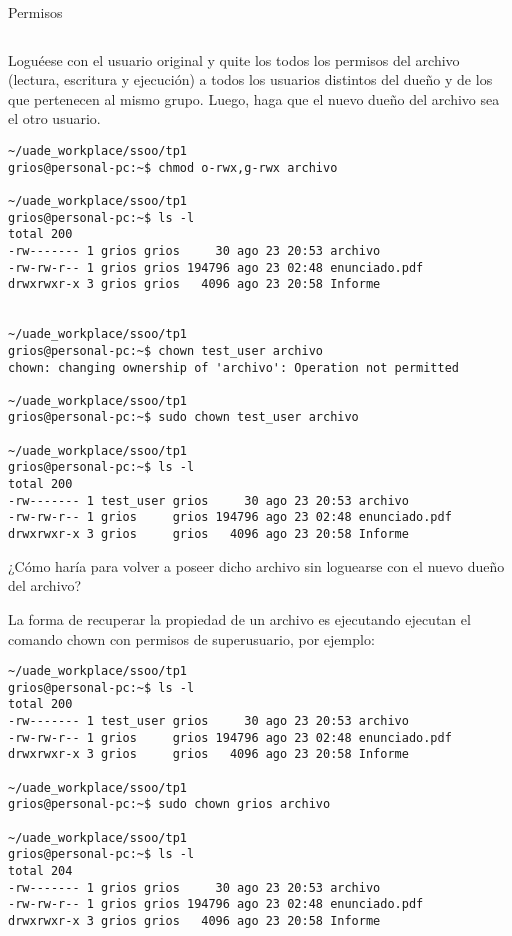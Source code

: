 \begin{section}{Permisos}
\begin{lstlisting}[style=Ubuntu]
\end{lstlisting}

\begin{quoting}
Loguéese con el usuario original y quite los todos los permisos del archivo (lectura, escritura y
ejecución) a todos los usuarios distintos del dueño y de los que pertenecen al mismo grupo. Luego, haga que
el nuevo dueño del archivo sea el otro usuario.
\end{quoting}

\begin{lstlisting}[style=Ubuntu]
~/uade_workplace/ssoo/tp1
grios@personal-pc:~$ chmod o-rwx,g-rwx archivo

~/uade_workplace/ssoo/tp1
grios@personal-pc:~$ ls -l                     
total 200
-rw------- 1 grios grios     30 ago 23 20:53 archivo
-rw-rw-r-- 1 grios grios 194796 ago 23 02:48 enunciado.pdf
drwxrwxr-x 3 grios grios   4096 ago 23 20:58 Informe


~/uade_workplace/ssoo/tp1
grios@personal-pc:~$ chown test_user archivo
chown: changing ownership of 'archivo': Operation not permitted

~/uade_workplace/ssoo/tp1
grios@personal-pc:~$ sudo chown test_user archivo

~/uade_workplace/ssoo/tp1
grios@personal-pc:~$ ls -l
total 200
-rw------- 1 test_user grios     30 ago 23 20:53 archivo
-rw-rw-r-- 1 grios     grios 194796 ago 23 02:48 enunciado.pdf
drwxrwxr-x 3 grios     grios   4096 ago 23 20:58 Informe

\end{lstlisting}

\begin{quoting}
¿Cómo haría para volver a poseer dicho archivo sin loguearse con el nuevo dueño del archivo?
\end{quoting}

La forma de recuperar la propiedad de un archivo es ejecutando ejecutan el comando chown con permisos de superusuario, por ejemplo:

\begin{lstlisting}[style=Ubuntu]
~/uade_workplace/ssoo/tp1
grios@personal-pc:~$ ls -l
total 200
-rw------- 1 test_user grios     30 ago 23 20:53 archivo
-rw-rw-r-- 1 grios     grios 194796 ago 23 02:48 enunciado.pdf
drwxrwxr-x 3 grios     grios   4096 ago 23 20:58 Informe

~/uade_workplace/ssoo/tp1
grios@personal-pc:~$ sudo chown grios archivo

~/uade_workplace/ssoo/tp1
grios@personal-pc:~$ ls -l
total 204
-rw------- 1 grios grios     30 ago 23 20:53 archivo
-rw-rw-r-- 1 grios grios 194796 ago 23 02:48 enunciado.pdf
drwxrwxr-x 3 grios grios   4096 ago 23 20:58 Informe


\end{lstlisting}
\end{section}
